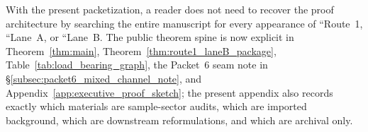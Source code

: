 \begin{remark}
With the present packetization, a reader does not need to recover the proof architecture by searching the entire manuscript for every appearance of ``Route~1, ``Lane~A, or ``Lane~B.
The public theorem spine is now explicit in Theorem~\ref{thm:main}, Theorem~\ref{thm:route1_laneB_package}, Table~\ref{tab:load_bearing_graph}, the Packet~6 seam note in \S\ref{subsec:packet6_mixed_channel_note}, and Appendix~\ref{app:executive_proof_sketch}; the present appendix also records exactly which materials are sample-sector audits, which are imported background, which are downstream reformulations, and which are archival only.
\end{remark}